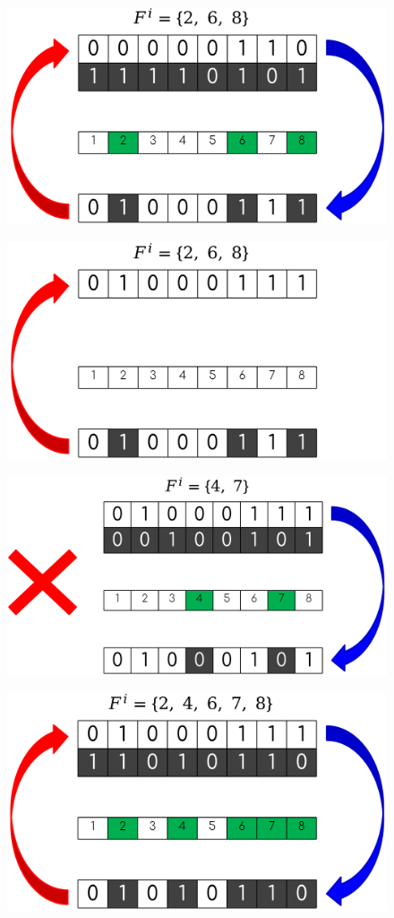 \documentclass{book}
\begin{document}
            \begin{figure}[H]
                \centering
                \includegraphics[width=0.7\linewidth]{images/ge_ex1.png}
                \label{fig:ge_ex1}
            \end{figure}
            \begin{figure}[H]
                \centering
                \includegraphics[width=0.7\linewidth]{images/ge_ex2.png}
                \label{fig:ge_ex2}
            \end{figure}
            \begin{figure}[H]
                \centering
                \includegraphics[width=0.7\linewidth]{images/ge_ex3.png}
                \label{fig:ge_ex3}
            \end{figure}
            \begin{figure}[H]
                \centering
                \includegraphics[width=0.7\linewidth]{images/ge_ex4.png}
                \label{fig:ge_ex4}
            \end{figure}
\end{document}
